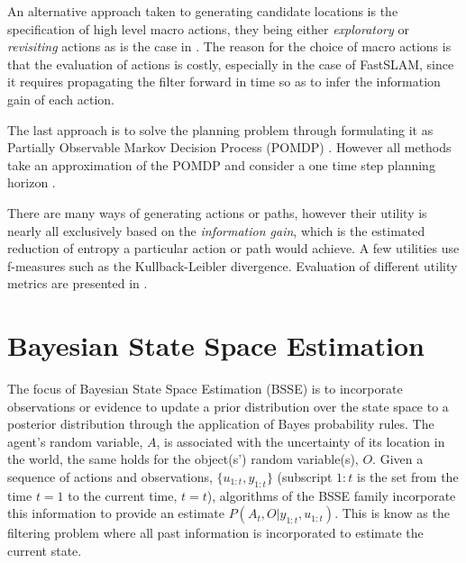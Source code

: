 An alternative approach taken to generating candidate locations is the specification of high level macro actions, they being either 
\textit{exploratory} or \textit{revisiting} actions as is the case in \cite{stachniss05robotics}. The reason for the choice of macro actions is that the evaluation
of actions is costly, especially in the case of FastSLAM, since it requires propagating the filter 
forward in time so as to infer the information gain of each action.

The last approach is to solve the planning problem through formulating it as  Partially Observable Markov Decision Process (POMDP) \cite{Ross08onlineplanning}. 
However all methods take an approximation of the POMDP and consider a one time step planning horizon \cite[p.37]{GeorgiosLidoris}.

There are many ways of generating actions or paths, however their utility is nearly all exclusively based on the \textit{information gain}, 
which is the estimated reduction of entropy a particular action or path would achieve. A few utilities use f-measures such as the Kullback-Leibler divergence. 
Evaluation of different utility metrics are presented in \cite{Active_SLAM_Uncertainty_compar,tovar_planning,KL_SLAM_exploration_PF}.



\section{Bayesian State Space Estimation}\label{ch5:BSSE}

The focus of Bayesian State Space Estimation (BSSE) is to incorporate observations or evidence to update a prior distribution over
the state space to a posterior distribution through the application of Bayes probability rules. The agent's random variable, $A$, 
is associated with the uncertainty of its location in the world, the same holds for the object(s') random variable(s), $O$. 
Given a sequence of actions and observations, $\{u_{1:t},y_{1:t}\}$ (subscript $1:t$ is the set from the time $t=1$ to the current time, $t=t$), 
algorithms of the BSSE family incorporate this information to provide an estimate $P(A_t,O|y_{1:t},u_{1:t})$. This is know as the 
filtering problem where all past information is incorporated to estimate the current state.  

